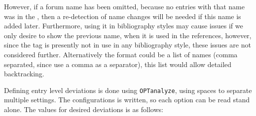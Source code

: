 However, if a forum name has been omitted, because no entries with
that name was in the , then a re-detection of name changes
will be needed if this name is added later.  Furthermore, using it in
bibliography styles may cause issues if we only desire to show the
previous name, when it is used in the references, however, since the
tag is presently not in use in any bibliography style, these issues
are not considered further.  Alternatively the format could be a list
of names (comma separated, since {\bibtex} use a comma as a
separator), this list would allow detailed backtracking.

Defining entry level deviations is done using \texttt{OPTanalyze},
using spaces to separate multiple settings.  The configurations is
written, so each option can be read stand alone.  The values for
desired deviations is as follows:

